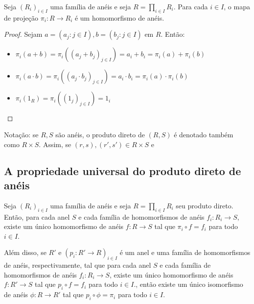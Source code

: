 \begin{lemma}
    Seja $(R_i)_{i \in I}$ uma família de anéis e seja $R=\prod_{i \in I}R_i$. Para cada $i \in I$, o mapa de projeção $\pi_i:R\rightarrow R_i$ é um homomorfismo de anéis.
\end{lemma}
\begin{proof}
    Sejam $a=(a_j: j \in I), b=(b_j: j \in I)$ em $R$. Então:
    \begin{itemize}
        \item $\pi_i(a+b)=\pi_i((a_j+b_j)_{j \in I})=a_i+b_i=\pi_i(a)+\pi_i(b)$
        \item $\pi_i(a\cdot b)=\pi_i((a_j\cdot b_j)_{j \in I})=a_i\cdot b_i=\pi_i(a)\cdot \pi_i(b)$
        \item $\pi_i(1_R)=\pi_i((1_j)_{j \in I})=1_{i}$
    \end{itemize}
\end{proof}
Notação: se $R, S$ são anéis, o produto direto de $(R, S)$ é denotado também como $R\times S$. Assim, se $(r, s), (r', s')\in R\times S$ e 

\subsection{A propriedade universal do produto direto de anéis}
\begin{theorem}
    Seja $(R_i)_{i \in I}$ uma família de anéis e seja $R=\prod_{i \in I}R_i$ seu produto direto. Então, para cada anel $S$ e cada família de homomorfismos de anéis $f_i:R_i\rightarrow S$, existe um único homomorfismo de anéis $f:R\rightarrow S$ tal que $\pi_i\circ f=f_i$ para todo $i \in I$.
    \begin{figure}[H]
        \centering
    \end{figure}

    Além disso, se $R'$ e $(p_i:R'\rightarrow R)_{i \in I}$ é um anel e uma família de homomorfismos de anéis, respectivamente, tal que para cada anel $S$ e cada família de homomorfismos de anéis $f_i:R_i\rightarrow S$, existe um único homomorfismo de anéis $f:R'\rightarrow S$ tal que $p_i\circ f=f_i$ para todo $i \in I$., então existe um único isomorfismo de anéis $\phi: R\rightarrow R'$ tal que $p_i\circ \phi=\pi_i$ para todo $i \in I$.
\end{theorem}

